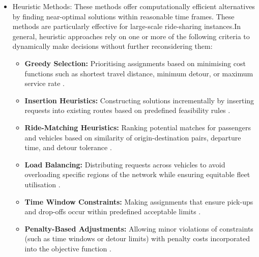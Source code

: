 \begin{itemize}
    \item Heuristic Methods: These methods offer computationally efficient alternatives by finding near-optimal solutions within reasonable time frames. These methods are particularly effective for large-scale ride-sharing instances.In general, heuristic approaches rely on one or more of the following criteria to dynamically make decisions without further reconsidering them:
    \begin{itemize}
        \item \textbf{Greedy Selection:} Prioritising assignments based on minimising cost functions such as shortest travel distance, minimum detour, or maximum service rate \cite{lu2021optimal}.
        \item \textbf{Insertion Heuristics:} Constructing solutions incrementally by inserting requests into existing routes based on predefined feasibility rules \cite{hyland2018sharing87}.
        \item \textbf{Ride-Matching Heuristics:} Ranking potential matches for passengers and vehicles based on similarity of origin-destination pairs, departure time, and detour tolerance \cite{stiglic2016making162, ma2013tshare118}.
        \item \textbf{Load Balancing:} Distributing requests across vehicles to avoid overloading specific regions of the network while ensuring equitable fleet utilisation \cite{goel2017optimal68}.
        \item \textbf{Time Window Constraints:} Making assignments that ensure pick-ups and drop-offs occur within predefined acceptable limits \cite{qian2017optimal143, dorey2014ridesharing53}.
        \item \textbf{Penalty-Based Adjustments:} Allowing minor violations of constraints (such as time windows or detour limits) with penalty costs incorporated into the objective function \cite{hyland2018sharing87}.
    \end{itemize}
    

\end{itemize}
